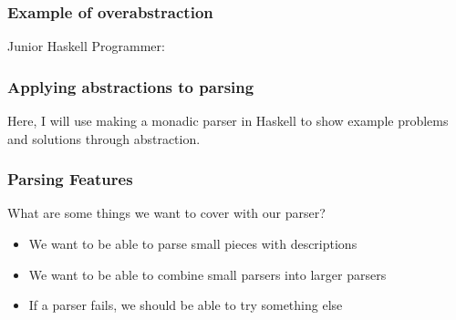 \documentclass{beamer}
\begin{document}
\begin{frame}
  \frametitle{Example of overabstraction}

  Junior Haskell Programmer:









\end{frame}


\begin{frame}
  \frametitle{Applying abstractions to parsing}

  Here, I will use making a monadic parser in Haskell 
  to show example problems and solutions through abstraction.
\end{frame}


\begin{frame}
  \frametitle{Parsing Features}

  What are some things we want to cover with our parser?
  \begin{itemize}
    \item We want to be able to parse small pieces with descriptions
    \item We want to be able to combine small parsers into larger parsers
    \item If a parser fails, we should be able to try something else
  \end{itemize}

\end{frame}
\end{document}
